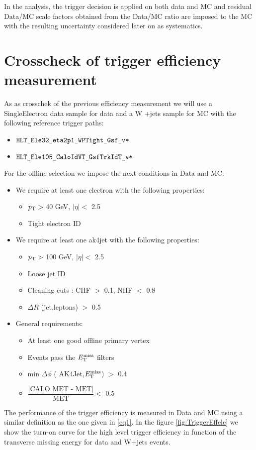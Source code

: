 In the analysis, the trigger decision is applied on both data and MC and residual Data/MC scale factors obtained from the Data/MC ratio are
imposed to the MC with the resulting uncertainty considered later on as systematics.

\section{Crosscheck of trigger efficiency measurement}

As as crosschek of the previous efficiency measurement we will use a SingleElectron data sample for data and a W +jets sample for MC with  the following reference trigger paths:

\begin{itemize}
\item
 $\verb|HLT_Ele32_eta2p1_WPTight_Gsf_v*|$
\item
$\verb|HLT_Ele105_CaloIdVT_GsfTrkIdT_v*|$
\end{itemize}

For the offline selection we impose the next conditions in Data and MC:
\begin{itemize}
\item
We require at least one electron with the following properties:
\begin{itemize}
\item
$p_{\mathrm{T}} >$  40 GeV, $\left| \eta \right| <$ 2.5
\item
Tight electron ID
\end{itemize}
\item
We require at least one ak4jet with the following properties:
\begin{itemize}
\item
$p_{\mathrm{T}} >$  100 GeV, $\left| \eta \right| <$ 2.5
\item
Loose jet ID
\item
Cleaning cuts : CHF $>$ 0.1, NHF $<$ 0.8
\item
$\Delta R$ (jet,leptons) $>$ 0.5
\end{itemize}
\item
General requirements:
\begin{itemize}
\item
At least one good offline primary vertex
\item
Events pass the $E_{\mathrm{T}}^{\text{miss}}$ filters
\item
min $\Delta \phi$ ( AK4Jet,$E_{\mathrm{T}}^{\text{miss}}$) $>$ 0.4
\item
$\dfrac{\left|\text{CALO MET - MET} \right|}{\text{MET}} <$ 0.5
\end{itemize}
\end{itemize}
The performance of the trigger efficiency is measured in Data and MC using a similar definition as the one given in \eqref{eq1}.
In the figure \ref{fig:TriggerEffele} we show the turn-on curve for the high level trigger efficiency in function of the transverse missing energy for data and W+jets events. 


